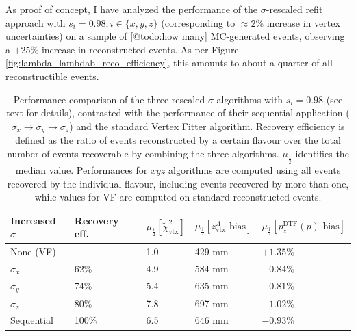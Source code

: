 As proof of concept, I have analyzed the performance of the $\sigma$-rescaled refit approach with $s_i=0.98, i\in\{x,y,z\}$ (corresponding to $\approx 2\%$ increase in vertex uncertainties) on a sample of [@todo:how many] MC-generated \demonstratorshort events, observing a $+25\%$ increase in reconstructed events.
As per Figure \ref{fig:lambda_lambdab_reco_efficiency}, this amounts to about a quarter of all reconstructible events.

\begin{table}[t]
	\begin{center}
	\begin{tabular}{@{}lllll@{}}
		\toprule
		Increased $\sigma$ & Recovery eff. & $\mu_\frac{1}{2}\left[\tilde{\chi}^2_\text{vtx}\right]$ & $\mu_\frac{1}{2}\left[z_\text{vtx}^\Lambda \text{ bias}\right]$ & $\mu_\frac{1}{2}\left[p_z^\text{DTF} (p) \text{ bias}\right]$ \\
		\midrule
		None (VF)  & -- & 1.0 & 429 mm & $+1.35\%$ \\
		$\sigma_x$ & 62\% & 4.9 & 584 mm & $-0.84\%$ \\
		$\sigma_y$ & 74\% & 5.4 & 635 mm & $-0.81\%$ \\
		$\sigma_z$ & 80\% & 7.8 & 697 mm & $-1.02\%$ \\
		Sequential & 100\% & 6.5 & 646 mm & $-0.93\%$ \\
		\bottomrule
	\end{tabular}
	\end{center}
	\caption[Performance comparison of the three rescaled-$\sigma$ algorithms.]{Performance comparison of the three rescaled-$\sigma$ algorithms with $s_i=0.98$ (see text for details), contrasted with the performance of their sequential application ($\sigma_x \rightarrow \sigma_y \rightarrow \sigma_z$) and the standard Vertex Fitter algorithm. Recovery efficiency is defined as the ratio of events reconstructed by a certain flavour over the total number of events recoverable by combining the three algorithms. $\mu_\frac{1}{2}$ identifies the median value. Performances for $xyz$ algorithms are computed using all events recovered by the individual flavour, including events recovered by more than one, while values for VF are computed on standard reconstructed events.}
	\label{tab:3:xyz_VF_performances}
\end{table}

